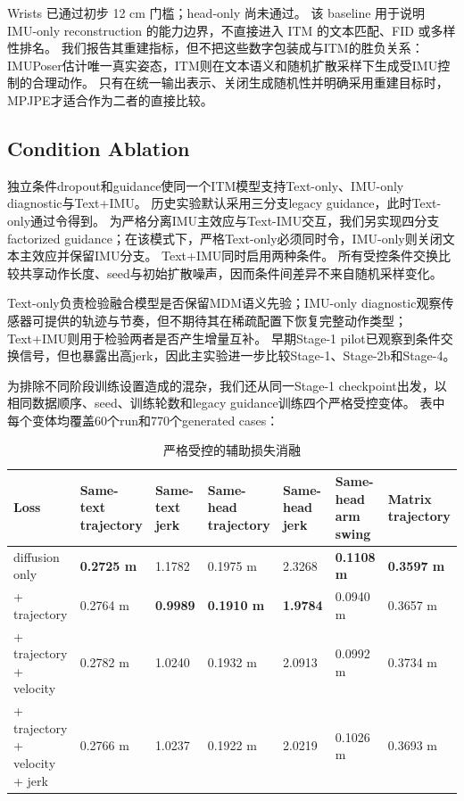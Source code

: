 Wrists 已通过初步 12 cm 门槛；head-only 尚未通过。
该 baseline 用于说明 IMU-only reconstruction 的能力边界，不直接进入 ITM 的文本匹配、FID 或多样性排名。
我们报告其重建指标，但不把这些数字包装成与ITM的胜负关系：IMUPoser估计唯一真实姿态，ITM则在文本语义和随机扩散采样下生成受IMU控制的合理动作。
只有在统一输出表示、关闭生成随机性并明确采用重建目标时，MPJPE才适合作为二者的直接比较。

\subsection{Condition Ablation}

独立条件dropout和guidance使同一个ITM模型支持Text-only、IMU-only diagnostic与Text+IMU。
历史实验默认采用三分支legacy guidance，此时Text-only通过令\texttt{}得到。
为严格分离IMU主效应与Text-IMU交互，我们另实现四分支factorized guidance；在该模式下，严格Text-only必须同时令\texttt{}，IMU-only则关闭文本主效应并保留IMU分支。
Text+IMU同时启用两种条件。
所有受控条件交换比较共享动作长度、seed与初始扩散噪声，因而条件间差异不来自随机采样变化。

Text-only负责检验融合模型是否保留MDM语义先验；IMU-only diagnostic观察传感器可提供的轨迹与节奏，但不期待其在稀疏配置下恢复完整动作类型；Text+IMU则用于检验两者是否产生增量互补。
早期Stage-1 pilot已观察到条件交换信号，但也暴露出高jerk，因此主实验进一步比较Stage-1、Stage-2b和Stage-4。

为排除不同阶段训练设置造成的混杂，我们还从同一Stage-1 checkpoint出发，以相同数据顺序、seed、训练轮数和legacy guidance训练四个严格受控变体。
表中每个变体均覆盖60个run和770个generated cases：

\begin{table}[t]
\centering
\caption{严格受控的辅助损失消融}
\label{tab:result-12}
\footnotesize
\setlength{\tabcolsep}{3pt}
\renewcommand{\arraystretch}{1.15}
\begin{tabularx}{\linewidth}{LLLLLLL}
\toprule
Loss & Same-text trajectory & Same-text jerk & Same-head trajectory & Same-head jerk & Same-head arm swing & Matrix trajectory \\
\midrule
diffusion only & \textbf{0.2725 m} & 1.1782 & 0.1975 m & 2.3268 & \textbf{0.1108 m} & \textbf{0.3597 m} \\
+ trajectory & 0.2764 m & \textbf{0.9989} & \textbf{0.1910 m} & \textbf{1.9784} & 0.0940 m & 0.3657 m \\
+ trajectory + velocity & 0.2782 m & 1.0240 & 0.1932 m & 2.0913 & 0.0992 m & 0.3734 m \\
+ trajectory + velocity + jerk & 0.2766 m & 1.0237 & 0.1922 m & 2.0219 & 0.1026 m & 0.3693 m \\
\bottomrule
\end{tabularx}
\end{table}


